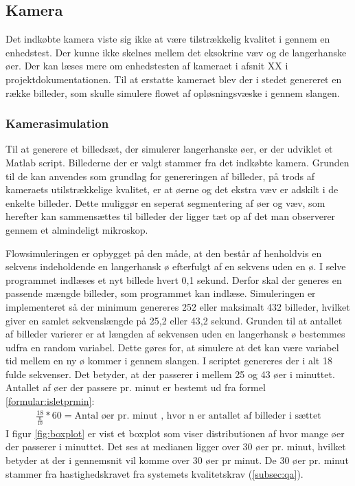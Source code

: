 \newpage
\subsection{Kamera}
Det indkøbte kamera viste sig ikke at være  tilstrækkelig kvalitet i gennem en enhedstest. Der kunne ikke skelnes mellem det eksokrine væv og de langerhanske øer. Der kan læses mere om enhedstesten af kameraet i afsnit XX i projektdokumentationen. Til at erstatte kameraet blev der i stedet genereret en række billeder, som skulle simulere flowet af opløsningsvæske i gennem slangen. 

\subsubsection{Kamerasimulation}
Til at generere et billedsæt, der simulerer langerhanske øer, er der udviklet et Matlab script. Billederne der er valgt stammer fra det indkøbte kamera. Grunden til de kan anvendes som grundlag for genereringen af billeder, på trods af kameraets utilstrækkelige kvalitet, er at øerne og det ekstra væv er adskilt i de enkelte billeder. Dette muliggør en seperat segmentering af øer og væv, som  herefter kan sammensættes til billeder der ligger tæt op af det man observerer gennem et almindeligt mikroskop. 

Flowsimuleringen er opbygget på den måde, at den består af henholdvis en sekvens indeholdende en langerhansk ø efterfulgt af en sekvens uden en ø. I selve programmet indlæses et nyt billede hvert 0,1 sekund. Derfor skal der generes en passende mængde billeder, som programmet kan indlæse. Simuleringen er implementeret så der minimum genereres 252 eller maksimalt 432 billeder, hvilket giver en samlet sekvenslængde på 25,2 eller 43,2 sekund. Grunden til at antallet af billeder varierer er at længden af sekvensen uden en langerhansk ø bestemmes udfra en random variabel. Dette gøres for, at simulere at det kan være variabel tid mellem en ny ø kommer i gennem slangen. I scriptet genereres der i alt 18 fulde sekvenser. Det betyder, at der passerer i mellem 25 og 43 øer i minuttet. Antallet af øer der passere pr. minut er bestemt ud fra formel \ref{formular:isletprmin}: 
\begin{align}
\frac{18}{\frac{n}{10}} * 60 = \text{Antal øer pr. minut}
\text{ , hvor n er antallet af billeder i sættet}
\label{formular:isletprmin}
\end{align} 
I figur \ref{fig:boxplot} er vist et boxplot som viser distributionen af hvor mange øer der passerer i minuttet. Det ses at medianen ligger over 30 øer pr. minut, hvilket betyder at der i gennemsnit vil komme over 30 øer pr minut. De 30 øer pr. minut stammer fra hastighedskravet fra systemets kvalitetskrav (\ref{subsec:qa}).

